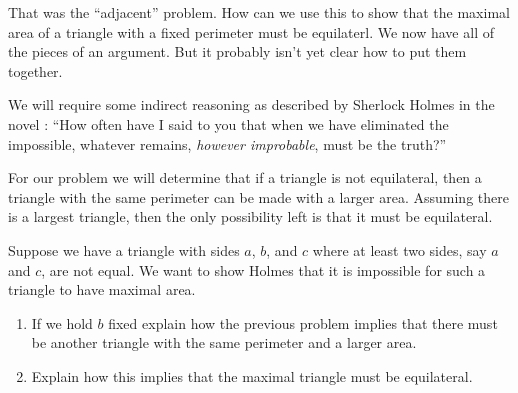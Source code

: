 That was the ``adjacent'' problem. How can we use this to show that
the maximal area of a triangle with a fixed perimeter must be
equilaterl.  We now have all of the pieces of an argument. But it
probably isn't yet clear how to put them together.

We will require some indirect reasoning as described by Sherlock
Holmes in the novel : ``How often have
I said to you that when we have eliminated the impossible, whatever
remains, \emph{however improbable}, must be the truth?''

For our problem we will determine that if a triangle is not
equilateral, then a triangle with the same perimeter can be made with
a larger area.  Assuming there is a largest triangle, then the only
possibility left is that it must be equilateral.

\begin{embeddedproblem}
  \label{problem:MaximalTriangle}
  Suppose we have a triangle with sides $a$, $b$, and $c$ where at
  least two sides, say $a$ and $c$, are not equal. We want to show
   Holmes that it is impossible for such a triangle
  to have maximal area.
  \begin{enumerate}[label={\bf{}(\alph*)}]
  \item If we hold $b$ fixed explain how the previous problem implies
    that there must be another triangle with the same perimeter and a
    larger area. 
  \item Explain how this implies that the maximal triangle must be
    equilateral.
  \end{enumerate}
\end{embeddedproblem}



